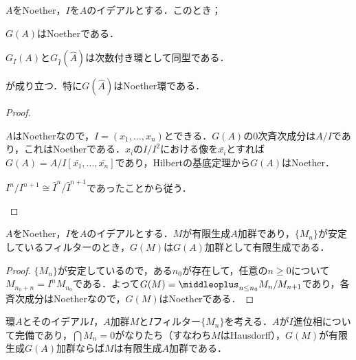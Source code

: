 \begin{prop}\label{prop:G(hat{A})はNoether}
	$A$をNoether，$I$を$A$のイデアルとする．このとき；
	\begin{sakura}
		\item $G(A)$はNoetherである．
		\item $G_I(A)$と$G_{\widehat{I}}(\widehat{A})$は次数付き環として同型である．
	\end{sakura}
	が成り立つ．特に$G(\widehat{A})$はNoether環である．
\end{prop}

\begin{proof}
	\begin{sakura}
		\item $A$はNoetherなので，$I=(x_1,\dots, x_n)$とできる．$G(A)$の$0$次斉次成分は$A/I$であり，これはNoetherである．$x_i$の$I/I^2$における像を$\bar{x_i}$とすれば$G(A)=A/I[\bar{x_1},\dots,\bar{x_n}]$であり，Hilbertの基底定理から$G(A)$はNoether．
		
		\item $I^n/I^{n+1}\cong\widehat{I}^n/\widehat{I}^{n+1}$であったことから従う．
	\end{sakura}
\end{proof}

\begin{prop}\label{prop:フィルターが安定していればG(M)は有限生成}
	$A$をNoether，$I$を$A$のイデアルとする．$M$が有限生成$A$加群であり，$\{M_n\}$が安定しているフィルターのとき，$G(M)$は$G(A)$加群として有限生成である．
\end{prop}

\begin{proof}
	$\{M_n\}$が安定しているので，ある$n_0$が存在して，任意の$n\geq0$について$M_{n_0+n}=I^nM_{n_0}$である．よって$G(M)=\middleoplus_{n\leq n_0}M_n/M_{n+1}$であり，各斉次成分はNoetherなので，$G(M)$はNoetherである．
\end{proof}

\begin{prop}
	環$A$とそのイデアル$I$，$A$加群$M$と$I$フィルター$\{M_n\}$を考える．$A$が$I$進位相について完備であり，$\bigcap M_n=0$がなりたち（すなわち$M$はHausdorff），$G(M)$が有限生成$G(A)$加群ならば$M$は有限生成$A$加群である．
\end{prop}

